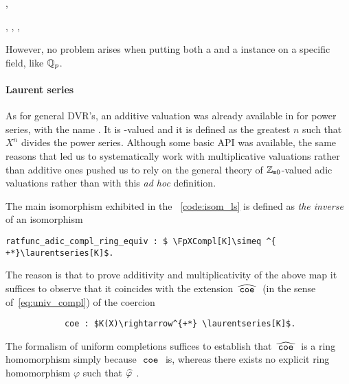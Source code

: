 \documentclass[sigplan,10pt, nonacm, review]{acmart}
\begin{document}
  , 

 , 
,  ,   

However,  no problem arises when putting both a  and a  instance on a specific field, like $\mathbb{Q}_p$.


\paragraph{Laurent series}
As for general DVR's, an additive valuation was already available in \mathlib for power series, with the name \href{https://leanprover-community.github.io/mathlib_docs/ring_theory/hahn_series.html#hahn_series.add_val}{\extlink}. It is -valued and it is defined as the greatest $n$ such that $X^n$ divides the power series. Although some basic API was available, the same reasons that led us to systematically work with multiplicative valuations rather than additive ones pushed us to rely on the general theory of $\mathbb{Z}_{\mathtt{m}0}$-valued adic valuations rather than with this \emph{ad hoc} definition.

The main isomorphism  exhibited in the \LClistingname~\ref{code:isom_ls} is defined as \emph{the inverse} of an isomorphism\href{https://github.com/LCFT-Lean/local_fields/blob/76ad487d09babdb0018f394a5634526637ee014a/src/laurent_series_equiv_adic_completion.lean#L823}{\extlink}
\begin{lstlisting}
ratfunc_adic_compl_ring_equiv : $ \FpXCompl[K]\simeq ^{ +*}\laurentseries[K]$.
\end{lstlisting}
The reason is that to prove additivity and multiplicativity of the above map it suffices to observe that it coincides with the extension $\compl{\mcode{coe}}$ (in the sense of~\eqref{eq:univ_compl}) of the coercion
\begin{lstlisting}
            coe : $K(X)\rightarrow^{+*} \laurentseries[K]$.
\end{lstlisting}
The formalism of uniform completions suffices to establish that $\compl{\mcode{coe}}$ is a ring homomorphism simply because $\mathtt{\ coe\ }$ is, whereas there exists no explicit ring homomorphism $\varphi$ such that $\compl{\varphi}$ .
 
\end{document}
